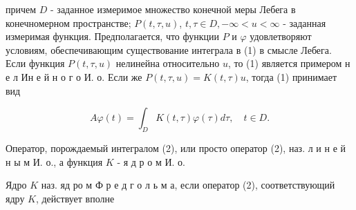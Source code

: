 \documentclass[10pt]{article}
\begin{document}
причем $D$ - заданное измеримое множество конечной меры Лебега в конечномерном пространстве; $P(t, \tau, u)$, $t, \tau \in D,-\infty<u<\infty$ - заданная измеримая функция. Предполагается, что функции $P$ и $\varphi$ удовлетворяют условиям, обеспечивающим существование интеграла в (1) в смысле Лебега. Если функция $P(t, \tau, u)$ нелинейна относительно $u$, то (1) является примером н е л Ин е й н о г о И. о. Если же $P(t, \tau, u)=K(t, \tau) u$, тогда (1) принимает вид



\[

A \varphi(t)=\int_{D} K(t, \tau) \varphi(\tau) d \tau, \quad t \in D .

\]



Оператор, порождаемый интегралом (2), или просто оператор (2), наз. л и н е й н ы м И. о., а функция $K$ - я д р о м И. о.



Ядро $K$ наз. яд ро м Ф р е д г о л ь м а, если оператор (2), соответствующий ядру $K$, действует вполне
\end{document}
